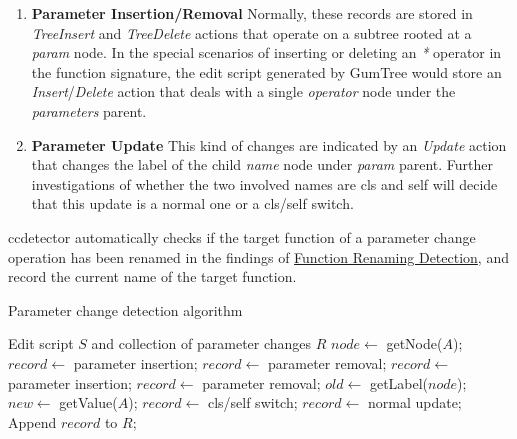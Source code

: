 \begin{enumerate}
	\item \textbf{Parameter Insertion/Removal} Normally, these records are stored in \textit{TreeInsert} and \textit{TreeDelete} actions that operate on a subtree rooted at a \textit{param} node. In the special scenarios of inserting or deleting an \textit{*} operator in the function signature, the edit script generated by GumTree would store an \textit{Insert}/\textit{Delete} action that deals with a single \textit{operator} node under the \textit{parameters} parent.
	\item \textbf{Parameter Update} This kind of changes are indicated by an \textit{Update} action that changes the label of the child \textit{name} node under \textit{param} parent. Further investigations of whether the two involved names are cls and self will decide that this update is a normal one or a cls/self switch.
\end{enumerate}

ccdetector automatically checks if the target function of a parameter change operation has been renamed in the findings of \hyperref[subsec:func-rename-detect]{Function Renaming Detection}, and record the current name of the target function.

\begin{algorithm}
	\label{algo:parameter-change-detection}
	\caption{Parameter change detection algorithm}
	\begin{algorithmic}[1]
		\REQUIRE Edit script $S$ and collection of parameter changes $R$
			\STATE $node \gets$ getNode($A$);
				\STATE $record \gets$ parameter insertion;
				\STATE $record \gets$ parameter removal;
				\STATE $record \gets$ parameter insertion;
				\STATE $record \gets$ parameter removal;
				\STATE $old \gets$ getLabel($node$);
				\STATE $new \gets$ getValue($A$);
					\STATE $record \gets$ cls/self switch;
				\ELSE
					\STATE $record \gets$ normal update;
				\ENDIF
			\ENDIF
			\STATE Append $record$ to $R$;
		\ENDFOR
	\end{algorithmic}
\end{algorithm}

